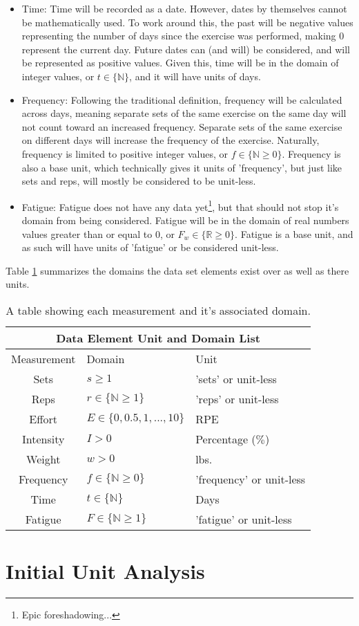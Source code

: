 \begin{itemize}
	\item Time: Time will be recorded as a date. However, dates by themselves cannot be mathematically used. To work around this, the past will be negative values representing the number of days since the exercise was performed, making $0$ represent the current day. Future dates can (and will) be considered, and will be represented as positive values. Given this, time will be in the domain of integer values, or $t\in \{ \mathbb{N} \}$, and it will have units of days.
	
	\item Frequency: Following the traditional definition, frequency will be calculated across days, meaning separate sets of the same exercise on the same day will not count toward an increased frequency. Separate sets of the same exercise on different days will increase the frequency of the exercise. Naturally, frequency is limited to positive integer values, or $f\in \{ \mathbb{N}\ge 0 \}$. Frequency is also a base unit, which technically gives it units of 'frequency', but just like sets and reps, will mostly be considered to be unit-less.
	
	\item Fatigue: Fatigue does not have any data yet\footnote{Epic foreshadowing...}, but that should not stop it's domain from being considered. Fatigue will be in the domain of real numbers values greater than or equal to $0$, or $F_w\in \{ \mathbb{R} \ge 0 \}$. Fatigue is a base unit, and as such will have units of 'fatigue' or be considered unit-less.
\end{itemize}

Table \ref{tab:P1C2_DomainUnitTable} summarizes the domains the data set elements exist over as well as there units.

\begin{table}[h]
	\centering
    \begin{tabular}{|c|l|l|}
	    \hline
	    \multicolumn{3}{|c|}{Data Element Unit and Domain List} \\
	    \hline
        Measurement & Domain & Unit \\
        \hline
        Sets & $s\ge 1$ & 'sets' or unit-less\\
        Reps & $r\in \{ \mathbb{N} \ge 1 \}$ & 'reps' or unit-less \\
        Effort & $E\in \{0,0.5,1,...,10\}$ & RPE \\
        Intensity & $I>0$ & Percentage ($\%$) \\
        Weight & $w>0$ & lbs. \\
        Frequency & $f\in \{ \mathbb{N}\ge 0 \}$ & 'frequency' or unit-less \\
        Time & $t\in \{ \mathbb{N} \}$ & Days \\
        Fatigue & $F\in \{ \mathbb{N} \ge 1 \}$ & 'fatigue' or unit-less \\
        \hline
    \end{tabular}
    \caption{A table showing each measurement and it's associated domain.}
    \label{tab:P1C2_DomainUnitTable}
\end{table}

\section{Initial Unit Analysis}